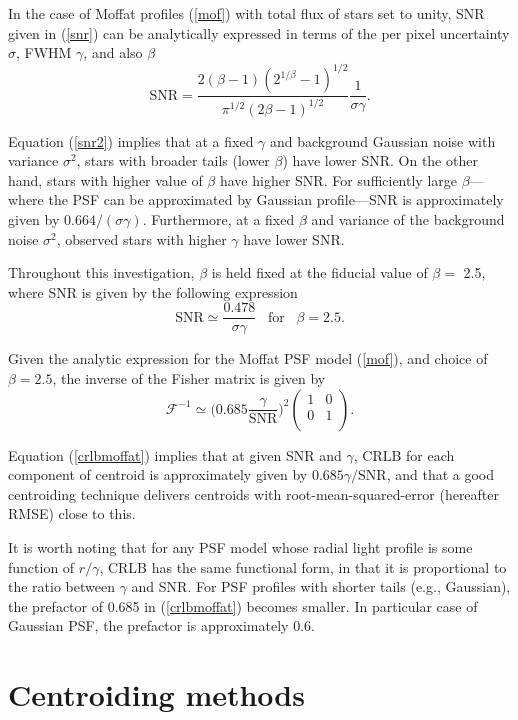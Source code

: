 \documentclass[12pt, preprint]{aastex}
\newcommand{\beq}{\begin{equation}}
\newcommand{\eeq}{\end{equation}}
\begin{document}
 In the case of Moffat profiles (\ref{mof}) with total flux of stars set to unity, 
SNR given in (\ref{snr}) can be analytically 
expressed in terms of the per pixel uncertainty
$\sigma$, FWHM $\gamma$, and also $\beta$
\beq
\text{SNR} = \frac{2(\beta-1)(2^{1/\beta}-1)^{1/2}}{\pi^{1/2}(2\beta-1)^{1/2}}\frac{1}{\sigma \gamma}.
\label{snr2}
\eeq

Equation (\ref{snr2}) implies that at a fixed $\gamma$ and background Gaussian noise 
with variance $\sigma^{2}$, stars with broader tails (lower $\beta$) have lower SNR.
On the other hand, stars with higher value of $\beta$ have higher SNR. 
For sufficiently large $\beta$---where the PSF can be
approximated by Gaussian profile---SNR is approximately given by $0.664/(\sigma\gamma)$.
Furthermore, at a fixed $\beta$ and variance of the background noise $\sigma^{2}$,
observed stars with higher $\gamma$ have lower SNR.  

Throughout this investigation, $\beta$ is held fixed at the fiducial value of $\beta=$ 2.5, where SNR
is given by the following expression
\beq
\text{SNR} \simeq \frac{0.478}{\sigma \gamma}\;\;\; \mathrm{for}\;\;\; \beta = 2.5.
\eeq

Given the analytic expression for the Moffat PSF model (\ref{mof}), and choice of $\beta=2.5$, 
the inverse of the Fisher matrix is given by
\beq
  \mathcal{F}^{-1} \simeq \Big(0.685 \frac{\gamma}{\text{SNR}}\Big)^{2} 
  \begin{pmatrix}
      1 & 0\\
      0 & 1\\
  \end{pmatrix}.
\label{crlbmoffat}
\eeq

Equation (\ref{crlbmoffat}) implies that at given SNR and $\gamma$,
CRLB for each component of centroid is approximately given by $0.685\gamma/\text{SNR}$,
and that a good centroiding technique delivers centroids with
root-mean-squared-error (hereafter RMSE) close to this. 

It is worth noting that for any PSF model whose radial light profile is some function of 
$r/\gamma$, CRLB has the same functional form, in that it is proportional to the ratio
between $\gamma$ and SNR. 
For PSF profiles with shorter tails (e.g., Gaussian), the prefactor of 0.685 in (\ref{crlbmoffat})
becomes smaller. In particular case of Gaussian PSF, the prefactor is approximately 0.6. 

\section{Centroiding methods}\label{sec:method}
\end{document}
